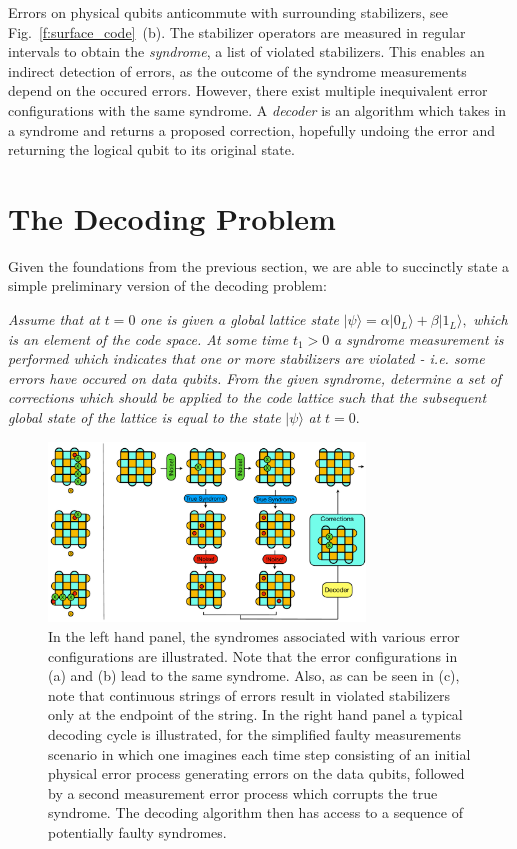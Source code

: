 \documentclass[onecolumn,preprintnumbers,amsmath,amssymb,notitlepage,nofootinbib,longbibliography,superscriptaddress,aps,pra,10pt]{revtex4-1}
\begin{document}
	Errors on physical qubits anticommute with surrounding stabilizers, see Fig.~\ref{f:surface_code}~(b).
	The stabilizer operators are measured in regular intervals to obtain the \textit{syndrome}, a list of violated stabilizers.
	This enables an indirect detection of errors, as the outcome of the syndrome measurements depend on the occured errors.
	However, there exist multiple inequivalent error configurations with the same syndrome.
	A \textit{decoder} is an algorithm which takes in a syndrome and returns a proposed correction, hopefully undoing the error and returning the logical qubit to its original state.

\section{The Decoding Problem}\label{s:the_decoding_problem}

    Given the foundations from the previous section, we are able to succinctly state a simple preliminary version of the decoding problem:\newline

    \noindent\textit{Assume that at} $t=0$  \textit{one is given a global lattice state} $|\psi\rangle = \alpha |0_L\rangle + \beta |1_L\rangle,$ \textit{which is an element of the code space. At some time }$t_1>0$ \textit{a syndrome measurement is performed which indicates that one or more stabilizers are violated - i.e. some errors have occured on data qubits. From the given syndrome, determine a set of corrections which should be applied to the code lattice such that the subsequent global state of the lattice is equal to the state} $|\psi\rangle$ \textit{at} $t=0.$\newline

    \begin{figure}
      \centering
          \includegraphics[width=0.75\textwidth]{decoding_problem.pdf}
      \caption{In the left hand panel, the syndromes associated with various error configurations are illustrated. Note that the error configurations in (a) and (b) lead to the same syndrome. Also, as can be seen in (c), note that continuous strings of errors result in violated stabilizers only at the endpoint of the string. In the right hand panel a typical decoding cycle is illustrated, for the simplified faulty measurements scenario in which one imagines each time step consisting of an initial physical error process generating errors on the data qubits, followed by a second measurement error process which corrupts the true syndrome. The decoding algorithm then has access to a sequence of potentially faulty syndromes.}\label{f:decoding_problem}
    \end{figure}
\end{document}

